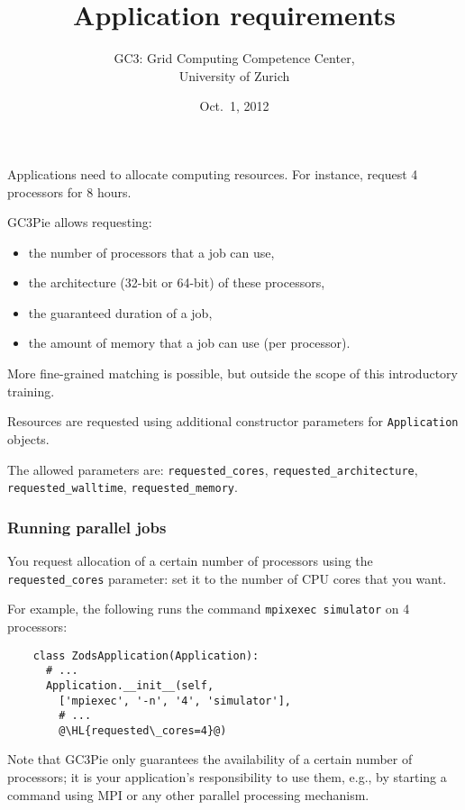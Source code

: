 \documentclass[english,serif,mathserif,xcolor=pdftex,dvipsnames,table]{beamer}
\title{%
  Application requirements
}
\author[Riccardo Murri]{%
  GC3: Grid Computing Competence Center, \\
  University of Zurich
}
\date{Oct.~1, 2012}
\begin{document}
\maketitle


\begin{frame}
  Applications need to allocate computing resources.
  For instance, request 4 processors for 8 hours.

  \+
  GC3Pie allows requesting:
  \begin{itemize}
  \item the number of processors that a job can use,
  \item the architecture (32-bit or 64-bit) of these processors,
  \item the guaranteed duration of a job,
  \item the amount of memory that a job can use (per processor).
  \end{itemize}

  \+
  More fine-grained matching is possible, but outside the scope of
  this introductory training.
\end{frame}


\begin{frame}
  Resources are requested using additional constructor parameters for
  \texttt{Application} objects.

  \+
  The allowed parameters are:
  \lstinline|requested_cores|,
  \lstinline|requested_architecture|,
  \lstinline|requested_walltime|,
  \lstinline|requested_memory|.
\end{frame}


\begin{frame}[fragile]
  \frametitle{Running parallel jobs}

  You request allocation of a certain number of processors using the
  \lstinline|requested_cores| parameter: set it to the number of CPU
  cores that you want.

  \+
  For example, the following runs the command \texttt{mpixexec
    simulator} on 4 processors:
  \begin{lstlisting}
    class ZodsApplication(Application):
      # ...
      Application.__init__(self,
        ['mpiexec', '-n', '4', 'simulator'],
        # ...
        @\HL{requested\_cores=4}@)
  \end{lstlisting}

  \+
  {\small Note that GC3Pie only guarantees the availability of a certain
    number of processors; it is your application's responsibility to use
    them, e.g., by starting a command using MPI or any other parallel
    processing mechanism.}
\end{frame}
\end{document}
